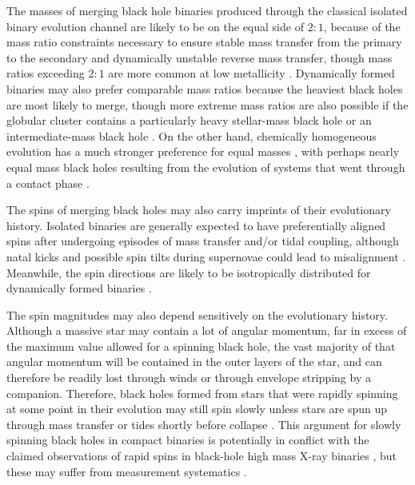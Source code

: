 \documentclass[iop,onecolumn]{revtex4}
\begin{document}
The masses of merging black hole binaries produced through the classical isolated binary evolution channel are likely to be on the equal side of $2:1$, because of the mass ratio constraints necessary to ensure stable mass transfer from the primary to the secondary and dynamically unstable reverse mass transfer, though mass ratios exceeding $2:1$ are more common at low metallicity \citep{Dominik:2012,Stevenson:2017}.  Dynamically formed binaries may also prefer comparable mass ratios because the heaviest black holes are most likely to merge, though more extreme mass ratios are also possible if the globular cluster contains a particularly heavy stellar-mass black hole or an intermediate-mass black hole \citep{Mandel:2008,Belczynski:2013VMS}.  On the other hand, chemically homogeneous evolution has a much stronger preference for equal masses \citep{MandeldeMink:2016}, with perhaps nearly equal mass black holes resulting from the evolution of systems that went through a contact phase \citep{Marchant:2016}.  

The spins of merging black holes may also carry imprints of their evolutionary history.  Isolated binaries are generally expected to have preferentially aligned spins after undergoing episodes of mass transfer and/or tidal coupling, although natal kicks and possible spin tilts during supernovae could lead to misalignment \citep[e.g.,][]{Farr:2011}.  Meanwhile, the spin directions are likely to be isotropically distributed for dynamically formed binaries \citep[e.g.,][]{Vitale:2015,Stevenson:2017spin,Farr:2017}.  

The spin magnitudes may also depend sensitively on the evolutionary history.  Although a massive star may contain a lot of angular momentum, far in excess of the maximum value allowed for a spinning black hole, the vast majority of that angular momentum will be contained in the outer layers of the star, and can therefore be readily lost through winds or through envelope stripping by a companion.  Therefore, black holes formed from stars that were rapidly spinning at some point in their evolution may still spin slowly unless stars are spun up through mass transfer or tides shortly before collapse \citep{Kushnir:2017,HotokezakaPiran:2017,Zaldarriaga:2017}.   This argument for slowly spinning black holes in compact binaries is potentially in conflict with the claimed observations of rapid spins in black-hole high mass X-ray binaries \citep{MillerMiller:2015}, but these may suffer from measurement systematics \citep[e.g.,][]{Kawano:2017}.  
\end{document}
